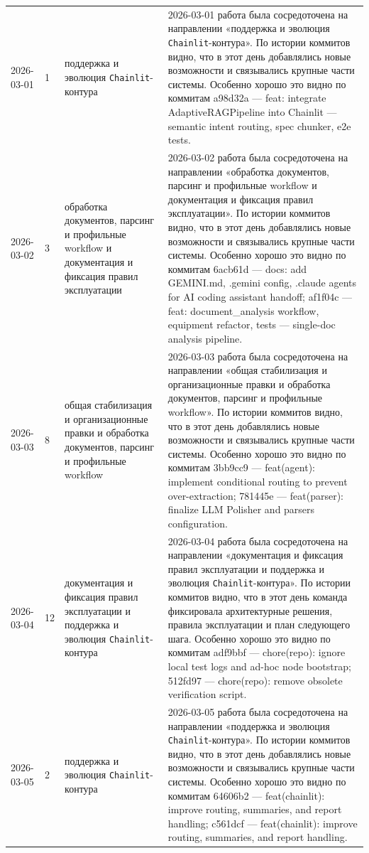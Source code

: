 \begin{longtable}{p{} p{} p{} p{}}
2026-03-01 & 1 & поддержка и эволюция \texttt{Chainlit}-контура & 2026-03-01 работа была сосредоточена на направлении «поддержка и эволюция \texttt{Chainlit}-контура». По истории коммитов видно, что в этот день добавлялись новые возможности и связывались крупные части системы. Особенно хорошо это видно по коммитам a98d32a — feat: integrate AdaptiveRAGPipeline into Chainlit — semantic intent routing, spec chunker, e2e tests. \\
2026-03-02 & 3 & обработка документов, парсинг и профильные workflow и документация и фиксация правил эксплуатации & 2026-03-02 работа была сосредоточена на направлении «обработка документов, парсинг и профильные workflow и документация и фиксация правил эксплуатации». По истории коммитов видно, что в этот день добавлялись новые возможности и связывались крупные части системы. Особенно хорошо это видно по коммитам 6acb61d — docs: add GEMINI.md, .gemini config, .claude agents for AI coding assistant handoff; af1f04c — feat: document\_analysis workflow, equipment refactor, tests — single-doc analysis pipeline. \\
2026-03-03 & 8 & общая стабилизация и организационные правки и обработка документов, парсинг и профильные workflow & 2026-03-03 работа была сосредоточена на направлении «общая стабилизация и организационные правки и обработка документов, парсинг и профильные workflow». По истории коммитов видно, что в этот день добавлялись новые возможности и связывались крупные части системы. Особенно хорошо это видно по коммитам 3bb9cc9 — feat(agent): implement conditional routing to prevent over-extraction; 781445e — feat(parser): finalize LLM Polisher and parsers configuration. \\
2026-03-04 & 12 & документация и фиксация правил эксплуатации и поддержка и эволюция \texttt{Chainlit}-контура & 2026-03-04 работа была сосредоточена на направлении «документация и фиксация правил эксплуатации и поддержка и эволюция \texttt{Chainlit}-контура». По истории коммитов видно, что в этот день команда фиксировала архитектурные решения, правила эксплуатации и план следующего шага. Особенно хорошо это видно по коммитам adf9bbf — chore(repo): ignore local test logs and ad-hoc node bootstrap; 512fd97 — chore(repo): remove obsolete verification script. \\
2026-03-05 & 2 & поддержка и эволюция \texttt{Chainlit}-контура & 2026-03-05 работа была сосредоточена на направлении «поддержка и эволюция \texttt{Chainlit}-контура». По истории коммитов видно, что в этот день добавлялись новые возможности и связывались крупные части системы. Особенно хорошо это видно по коммитам 64606b2 — feat(chainlit): improve routing, summaries, and report handling; c561dcf — feat(chainlit): improve routing, summaries, and report handling. \\

\end{longtable}
